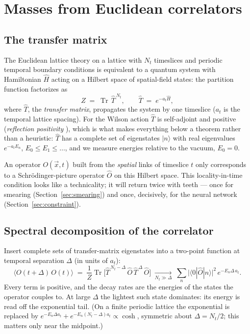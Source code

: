\documentclass[11pt,a4paper]{article}
\newcommand{\Tr}{\operatorname{Tr}}
\newcommand{\at}{a_t}
\newcommand{\That}{\hat{T}}
\begin{document}
\section{Masses from Euclidean correlators}
\label{sec:correlators}

\subsection{The transfer matrix}

The Euclidean lattice theory on a lattice with $N_t$ timeslices and periodic
temporal boundary conditions is equivalent to a quantum system with
Hamiltonian $\hat H$ acting on a Hilbert space of spatial-field states: the
partition function factorizes as
\begin{equation}
  Z \;=\; \Tr\, \That^{\,N_t},
  \qquad
  \That \;=\; e^{-\at \hat H},
\end{equation}
where $\That$, the \emph{transfer matrix}, propagates the system by one
timeslice ($\at$ is the temporal lattice spacing). For the Wilson action
$\That$ is self-adjoint and positive (\emph{reflection positivity}
\cite{OsterwalderSeiler1978}), which is what makes everything below a theorem
rather than a heuristic: $\That$ has a complete set of eigenstates $|n\rangle$
with real eigenvalues $e^{-\at E_n}$, $E_0 \le E_1 \le \dots$, and we measure
energies relative to the vacuum, $E_0 = 0$.

An operator $O(\vec x, t)$ built from the \emph{spatial} links of timeslice
$t$ only corresponds to a Schr\"odinger-picture operator $\hat O$ on this
Hilbert space. This locality-in-time condition looks like a technicality; it
will return twice with teeth --- once for smearing
(Section~\ref{sec:smearing}) and once, decisively, for the neural network
(Section~\ref{sec:constraint}).

\subsection{Spectral decomposition of the correlator}

Insert complete sets of transfer-matrix eigenstates into a two-point function
at temporal separation $\Delta$ (in units of $\at$):
\begin{equation}
  \big\langle O(t{+}\Delta)\, O(t) \big\rangle
  \;=\;
  \frac{1}{Z}\Tr\!\big[ \That^{\,N_t-\Delta}\, \hat O\, \That^{\,\Delta}\, \hat O \big]
  \;\xrightarrow[N_t\gg\Delta]{}\;
  \sum_{n} \big|\langle 0|\hat O|n\rangle\big|^2\, e^{-E_n \Delta\,\at}.
  \label{eq:spectral}
\end{equation}
Every term is positive, and the decay rates are the energies of the states
the operator couples to. At large $\Delta$ the lightest such state dominates:
its energy is read off the exponential tail. (On a finite periodic lattice
the exponential is replaced by
$e^{-E_n\Delta \at}+e^{-E_n(N_t-\Delta)\at}\propto\cosh$, symmetric about
$\Delta=N_t/2$; this matters only near the midpoint.)
\end{document}
